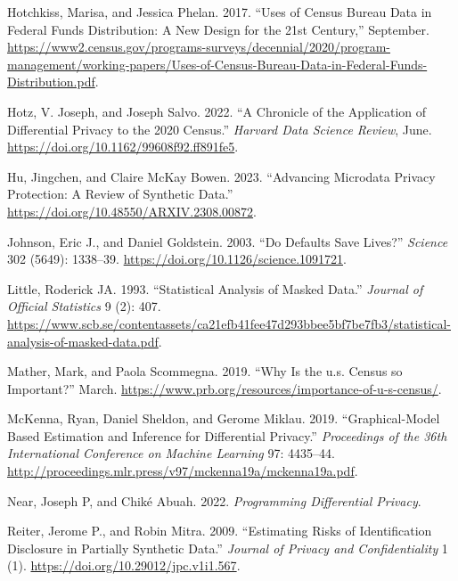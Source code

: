 \documentclass[
]{urban-formatting}
\newlength{\cslhangindent}
\newlength{\cslentryspacingunit} %
\newenvironment{CSLReferences}[2] %
 {%
  \setlength{\parindent}{0pt}
  \ifodd #1
  \let\oldpar\par
  \def\par{\hangindent=\cslhangindent\oldpar}
  \fi
  \setlength{\parskip}{#2\cslentryspacingunit}
 }%
 {}
\begin{document}
\begin{CSLReferences}{1}{0}
\leavevmode{}%
Hotchkiss, Marisa, and Jessica Phelan. 2017. {``Uses of Census Bureau
Data in Federal Funds Distribution: A New Design for the 21st
Century,''} September.
\url{https://www2.census.gov/programs-surveys/decennial/2020/program-management/working-papers/Uses-of-Census-Bureau-Data-in-Federal-Funds-Distribution.pdf}.

\leavevmode{}%
Hotz, V. Joseph, and Joseph Salvo. 2022. {``A Chronicle of the
Application of Differential Privacy to the 2020 Census.''} \emph{Harvard
Data Science Review}, June.
\url{https://doi.org/10.1162/99608f92.ff891fe5}.

\leavevmode{}%
Hu, Jingchen, and Claire McKay Bowen. 2023. {``Advancing Microdata
Privacy Protection: A Review of Synthetic Data.''}
\url{https://doi.org/10.48550/ARXIV.2308.00872}.

\leavevmode{}%
Johnson, Eric J., and Daniel Goldstein. 2003. {``Do Defaults Save
Lives?''} \emph{Science} 302 (5649): 1338--39.
\url{https://doi.org/10.1126/science.1091721}.

\leavevmode{}%
Little, Roderick JA. 1993. {``Statistical Analysis of Masked Data.''}
\emph{Journal of Official Statistics} 9 (2): 407.
\url{https://www.scb.se/contentassets/ca21efb41fee47d293bbee5bf7be7fb3/statistical-analysis-of-masked-data.pdf}.

\leavevmode{}%
Mather, Mark, and Paola Scommegna. 2019. {``Why Is the u.s. Census so
Important?''} March.
\url{https://www.prb.org/resources/importance-of-u-s-census/}.

\leavevmode{}%
McKenna, Ryan, Daniel Sheldon, and Gerome Miklau. 2019.
{``Graphical-Model Based Estimation and Inference for Differential
Privacy.''} \emph{Proceedings of the 36th International Conference on
Machine Learning} 97: 4435--44.
\url{http://proceedings.mlr.press/v97/mckenna19a/mckenna19a.pdf}.

\leavevmode{}%
Near, Joseph P, and Chiké Abuah. 2022. \emph{Programming Differential
Privacy}.

\leavevmode{}%
Reiter, Jerome P., and Robin Mitra. 2009. {``Estimating Risks of
Identification Disclosure in Partially Synthetic Data.''} \emph{Journal
of Privacy and Confidentiality} 1 (1).
\url{https://doi.org/10.29012/jpc.v1i1.567}.


\end{CSLReferences}
\end{document}
